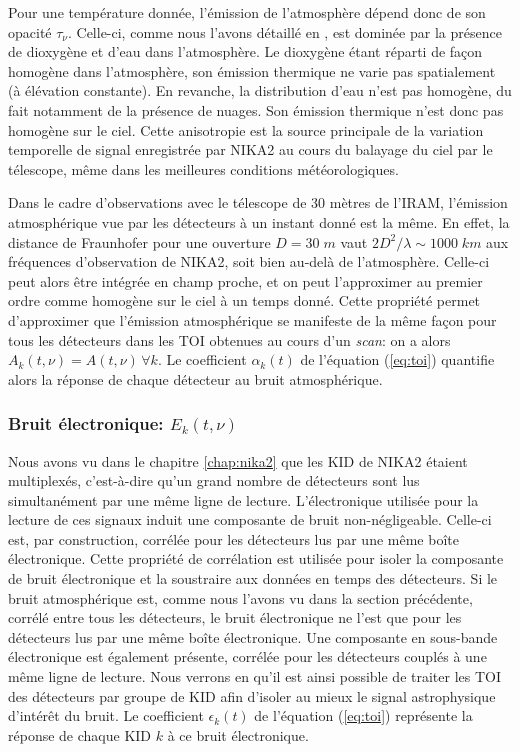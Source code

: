 Pour une température donnée, l'émission de l'atmosphère dépend donc de son opacité $\tau_\nu$.
Celle-ci, comme nous l'avons détaillé en , est dominée par la présence de dioxygène et d'eau dans l'atmosphère.
Le dioxygène étant réparti de façon homogène dans l'atmosphère, son émission thermique ne varie pas spatialement (à élévation constante).
En revanche, la distribution d'eau n'est pas homogène, du fait notamment de la présence de nuages.
Son émission thermique n'est donc pas homogène sur le ciel.
Cette anisotropie est la source principale de la variation temporelle de signal enregistrée par NIKA2 au cours du balayage du ciel par le télescope, même dans les meilleures conditions météorologiques.

Dans le cadre d'observations avec le télescope de 30 mètres de l'IRAM, l'émission atmosphérique vue par les détecteurs à un instant donné est la même.
En effet, la distance de Fraunhofer pour une ouverture $D=30 \;\unit{m}$ vaut $2D^2/\lambda \sim 1000 \;\unit{km}$ aux fréquences d'observation de NIKA2, soit bien au-delà de l'atmosphère.
Celle-ci peut alors être intégrée en champ proche\footnotemark, et on peut l'approximer au premier ordre comme homogène sur le ciel à un temps donné.
Cette propriété permet d'approximer que l'émission atmosphérique se manifeste de la même façon pour tous les détecteurs dans les TOI obtenues au cours d'un \textit{scan}: on a alors $A_k(t, \nu) = A(t, \nu) \, \forall k$.
Le coefficient $\alpha_k(t)$ de l'équation (\ref{eq:toi}) quantifie alors la réponse de chaque détecteur au bruit atmosphérique.

\subsubsection{Bruit électronique: $E_k(t, \nu)$} %
Nous avons vu dans le chapitre \ref{chap:nika2} que les KID de NIKA2 étaient multiplexés, c'est-à-dire qu'un grand nombre de détecteurs sont lus simultanément par une même ligne de lecture.
L'électronique utilisée pour la lecture de ces signaux induit une composante de bruit non-négligeable.
Celle-ci est, par construction, corrélée pour les détecteurs lus par une même boîte électronique.
Cette propriété de corrélation est utilisée pour isoler la composante de bruit électronique et la soustraire aux données en temps des détecteurs.
Si le bruit atmosphérique est, comme nous l'avons vu dans la section précédente, corrélé entre tous les détecteurs, le bruit électronique ne l'est que pour les détecteurs lus par une même boîte électronique.
Une composante en sous-bande électronique est également présente, corrélée pour les détecteurs couplés à une même ligne de lecture.
Nous verrons en  qu'il est ainsi possible de traiter les TOI des détecteurs par groupe de KID afin d'isoler au mieux le signal astrophysique d'intérêt du bruit.
Le coefficient $\epsilon_k(t)$ de l'équation (\ref{eq:toi}) représente la réponse de chaque KID $k$ à ce bruit électronique.

